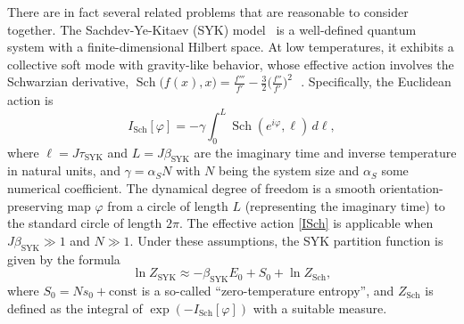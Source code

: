 \documentclass[11pt]{article}
\newcommand{\vp}{\varphi}
\newcommand{\const}{\mathrm{const}}
\DeclareMathOperator{\Sch}{Sch}
\newcommand{\SYK}{\text{SYK}}
\begin{document}
There are in fact several related problems that are reasonable to consider together. The Sachdev-Ye-Kitaev (SYK) model~\cite{SaYe93,Kit.KITP,SoftMode} is a well-defined quantum system with a finite-dimensional Hilbert space. At low temperatures, it exhibits a collective soft mode with gravity-like behavior, whose effective action involves the Schwarzian derivative, $\Sch\bigl(f(x),x\bigr)
=\frac{f'''}{f'}-\frac{3}{2}\bigl(\frac{f''}{f'}\bigr)^2$\,~\cite{Kit.KITP,MS16,SoftMode}. Specifically, the Euclidean action is
\begin{equation}\label{ISch}
I_{\Sch}[\vp]=-\gamma\int_{0}^{L}\Sch(e^{i\vp},\ell)\,d\ell,
\end{equation}
where $\ell=J\tau_{\SYK}$ and $L=J\beta_{\SYK}$ are the imaginary time and inverse temperature in natural units, and $\gamma=\alpha_{S}N$ with $N$ being the system size and $\alpha_{S}$ some numerical coefficient. The dynamical degree of freedom is a smooth orientation-preserving map $\vp$ from a circle of length $L$ (representing the imaginary time) to the standard circle of length $2\pi$. The effective action \eqref{ISch} is applicable when $J\beta_{\SYK}\gg 1$ and $N\gg 1$. Under these assumptions, the SYK partition function is given by the formula
\begin{equation}\label{FSYK}
\ln Z_{\SYK}\approx -\beta_{\SYK}E_0+S_0+\ln Z_{\Sch},
\end{equation}
where $S_0=Ns_0+\const$ is a so-called ``zero-temperature entropy'', and $Z_{\Sch}$ is defined as the integral of $\exp(-I_{\Sch}[\vp])$ with a suitable measure.
\end{document}
